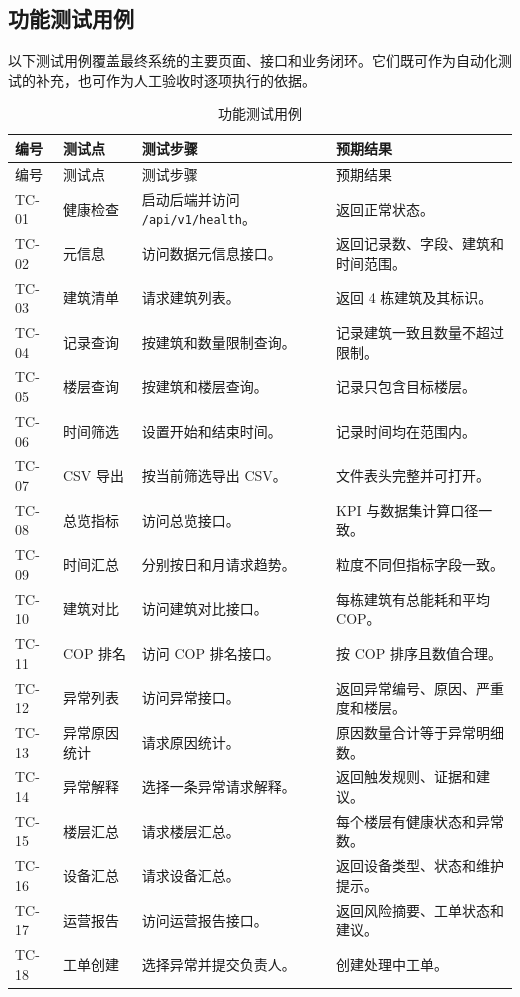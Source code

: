 \documentclass[12pt,a4paper]{ctexart}
\newcommand{\code}[1]{{\footnotesize\nolinkurl{#1}}}
\begin{document}
\subsection{功能测试用例}
以下测试用例覆盖最终系统的主要页面、接口和业务闭环。它们既可作为自动化测试的补充，也可作为人工验收时逐项执行的依据。
\begin{longtable}{L{1.6cm}L{3.0cm}L{5.6cm}L{4.8cm}}
\caption{功能测试用例}\\
\toprule
编号 & 测试点 & 测试步骤 & 预期结果 \\
\midrule
\endfirsthead
\toprule
编号 & 测试点 & 测试步骤 & 预期结果 \\
\midrule
\endhead
TC-01 & 健康检查 & 启动后端并访问 \code{/api/v1/health}。 & 返回正常状态。 \\
TC-02 & 元信息 & 访问数据元信息接口。 & 返回记录数、字段、建筑和时间范围。 \\
TC-03 & 建筑清单 & 请求建筑列表。 & 返回 4 栋建筑及其标识。 \\
TC-04 & 记录查询 & 按建筑和数量限制查询。 & 记录建筑一致且数量不超过限制。 \\
TC-05 & 楼层查询 & 按建筑和楼层查询。 & 记录只包含目标楼层。 \\
TC-06 & 时间筛选 & 设置开始和结束时间。 & 记录时间均在范围内。 \\
TC-07 & CSV 导出 & 按当前筛选导出 CSV。 & 文件表头完整并可打开。 \\
TC-08 & 总览指标 & 访问总览接口。 & KPI 与数据集计算口径一致。 \\
TC-09 & 时间汇总 & 分别按日和月请求趋势。 & 粒度不同但指标字段一致。 \\
TC-10 & 建筑对比 & 访问建筑对比接口。 & 每栋建筑有总能耗和平均 COP。 \\
TC-11 & COP 排名 & 访问 COP 排名接口。 & 按 COP 排序且数值合理。 \\
TC-12 & 异常列表 & 访问异常接口。 & 返回异常编号、原因、严重度和楼层。 \\
TC-13 & 异常原因统计 & 请求原因统计。 & 原因数量合计等于异常明细数。 \\
TC-14 & 异常解释 & 选择一条异常请求解释。 & 返回触发规则、证据和建议。 \\
TC-15 & 楼层汇总 & 请求楼层汇总。 & 每个楼层有健康状态和异常数。 \\
TC-16 & 设备汇总 & 请求设备汇总。 & 返回设备类型、状态和维护提示。 \\
TC-17 & 运营报告 & 访问运营报告接口。 & 返回风险摘要、工单状态和建议。 \\
TC-18 & 工单创建 & 选择异常并提交负责人。 & 创建处理中工单。 \\

\end{longtable}
\end{document}
